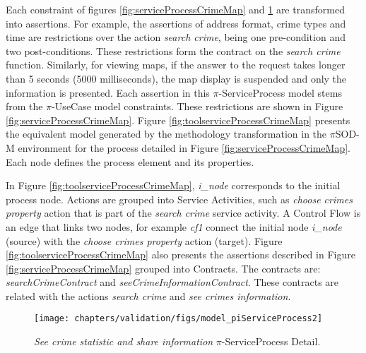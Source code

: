Each constraint of figures \ref{fig:serviceProcessCrimeMap} and
\ref{fig:serviceProcessCrimeMap2} are transformed into assertions. For example,
the assertions of address format,  crime types and time are restrictions over 
the action \textit{search crime}, being one pre-condition and two
post-conditions. These restrictions form the contract on the \textit{search
crime} function. Similarly, for viewing maps, if the answer to the request
takes longer than 5 seconds (5000 milliseconds), the map display is suspended and only 
the information is presented. Each assertion in this $\pi$-ServiceProcess model
stems from the $\pi$-UseCase model constraints. These restrictions are shown
in Figure \ref{fig:serviceProcessCrimeMap}. Figure
\ref{fig:toolserviceProcessCrimeMap} presents the equivalent model
generated by the methodology transformation in the $\pi$SOD-M environment for
the process detailed in Figure \ref{fig:serviceProcessCrimeMap}. Each node
defines the process element and its properties.

In Figure \ref{fig:toolserviceProcessCrimeMap}, \textit{i\_node} corresponds
to the initial process node. {\sc Actions} are grouped into  {\sc Service
Activities}, such as \textit{choose crimes property} action that is part of
the \textit{search crime} service activity. A {\sc Control Flow} is an edge that
links two nodes, for example \textit{cf1} connect the initial node
\textit{i\_node} (source) with the \textit{choose crimes property} action
(target). Figure \ref{fig:toolserviceProcessCrimeMap} also presents the
assertions described in Figure \ref{fig:serviceProcessCrimeMap} grouped into 
{\sc Contracts}. The contracts are: \textit{searchCrimeContract} and
\textit{seeCrimeInformationContract}. These contracts are related with the
actions \textit{search crime} and \textit{see crimes information}.

\begin{figure}[ht!]   
\centering
\texttt{[image: chapters/validation/figs/model\_piServiceProcess2]}
\caption{\textit{See crime statistic and share information} $\pi$-ServiceProcess
Detail.}
\label{fig:serviceProcessCrimeMap2}
\end{figure}   


